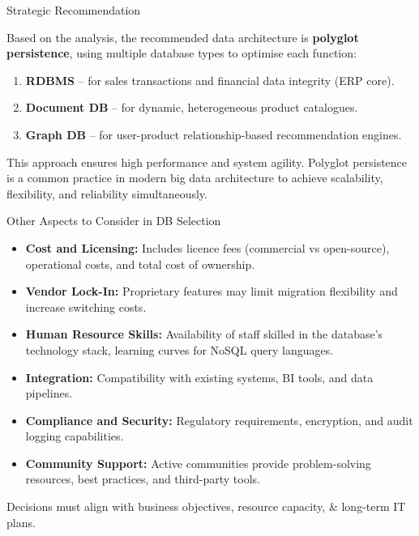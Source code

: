 \documentclass[aspectratio=169, table]{beamer}
\begin{document}
\begin{frame}{Strategic Recommendation}
	\vspace{20pt}
	
	Based on the analysis, the recommended data architecture is \textbf{polyglot persistence}, using multiple database types to optimise each function:
	
	\vspace{10pt}
	\begin{enumerate}
		\item \textbf{RDBMS} – for sales transactions and financial data integrity (ERP core).
		\item \textbf{Document DB} – for dynamic, heterogeneous product catalogues.
		\item \textbf{Graph DB} – for user-product relationship-based recommendation engines.
	\end{enumerate}
	
	This approach ensures high performance and system agility. Polyglot persistence is a common practice in modern big data architecture to achieve scalability, flexibility, and reliability simultaneously.
	
\end{frame}

\begin{frame}{Other Aspects to Consider in DB Selection}
	\vspace{20pt}
	
	\begin{itemize}
		\item \textbf{Cost and Licensing:} Includes licence fees (commercial vs open-source), operational costs, and total cost of ownership.
		
		\item \textbf{Vendor Lock-In:} Proprietary features may limit migration flexibility and increase switching costs.
		
		\item \textbf{Human Resource Skills:} Availability of staff skilled in the database’s technology stack, learning curves for NoSQL query languages.
		
		\item \textbf{Integration:} Compatibility with existing systems, BI tools, and data pipelines.
		
		\item \textbf{Compliance and Security:} Regulatory requirements, encryption, and audit logging capabilities.
		
		\item \textbf{Community Support:} Active communities provide problem-solving resources, best practices, and third-party tools.
	\end{itemize}
	
	Decisions must align with business objectives, resource capacity, \& long-term IT plans.
	
\end{frame}
\end{document}
